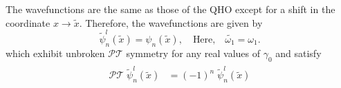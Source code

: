 \documentclass[a4paper, 12pt]{article}
\newcommand{\td}[1]{\tilde{#1}}
\begin{document}
The wavefunctions are the same as those of the QHO except for a shift in the coordinate \( x \rightarrow \tilde{x} \). Therefore, the wavefunctions are given by
\begin{equation}\label{1D-psi}
  \td{\psi}_n^l(\td{x})=\psi_n(\td{x}),\quad\text{Here,}\quad \td{\omega_1}=\omega_1.
\end{equation}
which exhibit unbroken \( \mathcal{PT} \) symmetry for any real values of $\gamma_0$ and satisfy
\begin{align}
    \begin{split}
    \mathcal{PT}\;\td{\psi}_n^l(\td{x})&=(-1)^n\;\td{\psi}_n^l(\td{x})
    \end{split}
\end{align}
\end{document}
